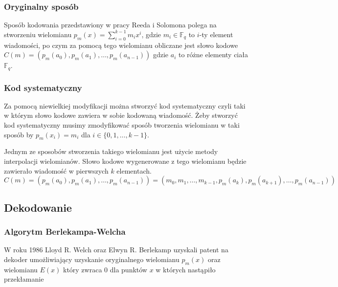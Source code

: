 \subsubsection{Oryginalny sposób}
Sposób kodowania przedstawiony w pracy Reeda i Solomona polega na stworzeniu wielomianu $p_m(x)=\sum_{i=0}^{k-1}m_{i}x^i$, gdzie $m_i\in\mathbb{F}_q$ to $i$\nobreakdash-ty element wiadomości, po czym za pomocą tego wielomianu obliczane jest słowo kodowe $C(m)=(p_m(a_0), p_m(a_1), \ldots, p_m(a_{n-1}))$ gdzie $a_i$ to różne elementy ciała $\mathbb{F}_q$.

\subsubsection{Kod systematyczny}
\label{subsection:Kod systematyczny}
Za pomocą niewielkiej modyfikacji można stworzyć kod systematyczny czyli taki w którym słowo kodowe zawiera w sobie kodowaną wiadomość.
Żeby stworzyć kod systematyczny musimy zmodyfikować sposób tworzenia wielomianu w taki sposób by $p_m(x_i)=m_i$ dla $i \in \{0,1,\ldots,k-1\}$.

Jednym ze sposobów stworzenia takiego wielomianu jest użycie metody interpolacji wielomianów. Słowo kodowe wygenerowane z tego wielomianu będzie zawierało wiadomość w pierwszych $k$ elementach.
\[C(m)=(p_m(a_0), p_m(a_1), \ldots, p_m(a_{n-1})) = (m_0, m_1, \ldots, m_{k-1}, p_m(a_k), p_m(a_{k+1}), \ldots, p_m(a_{n-1}))\]

\subsection{Dekodowanie}
\subsubsection{Algorytm Berlekampa-Welcha}
W roku 1986 Lloyd R. Welch oraz Elwyn R. Berlekamp uzyskali patent na dekoder umożliwiający uzyskanie oryginalnego wielomianu $p_m(x)$ oraz wielomianu $E(x)$ który zwraca 0 dla punktów $x$ w których nastąpiło przekłamanie~\cite{Berlekamp-Welch}
